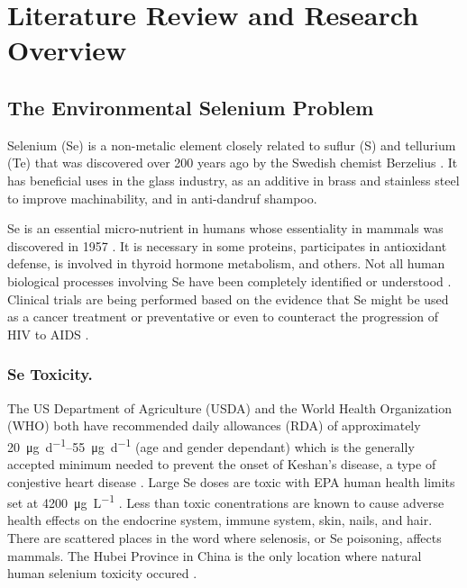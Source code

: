 \chapter{Literature Review and Research Overview}
\label{chap:litreview}

\begin{linenumbers}[1]

\section{The Environmental Selenium Problem}
\label{sec:the selenium problem}

Selenium (Se) is a non-metalic element closely related to suflur (S) and tellurium (Te) that was discovered over 200 years ago by the Swedish chemist Berzelius \parencite{scott1973}.  It has beneficial uses in the glass industry, as an additive in brass and stainless steel to improve machinability, and in anti-dandruf shampoo.  

Se is an essential micro-nutrient in humans whose essentiality in mammals was discovered in 1957 \parencite{schwarz1957}.   It is necessary in some proteins, participates in antioxidant defense, is involved in thyroid hormone metabolism, and others.  Not all human biological processes involving Se have been completely identified or understood \parencite{rayman2000,navarro2000,roman2014}.  Clinical trials are being performed based on the evidence that Se might be used as a cancer treatment or preventative or even to counteract the progression of HIV to AIDS \parencite{rayman2000,roman2014}.

\subsection*{Se Toxicity.}
The US Department of Agriculture (USDA) and the World Health Organization (WHO) both have recommended daily allowances (RDA) of approximately \SIrange{20}{55}{\micro\gram\per\day} (age and gender dependant) which is the generally accepted minimum needed to prevent the onset of Keshan's disease, a type of conjestive heart disease \parencite{world1996,USDA2010}.  Large Se doses are toxic \parencite{roman2014,navarro2000} with EPA human health limits set at \SI{4200}{\micro\gram\per\liter} \parencite{EPA-Se}.  Less than toxic conentrations are known to cause adverse health effects on the endocrine system, immune system, skin, nails, and hair.  There are scattered places in the word where selenosis, or Se poisoning, affects mammals.  The Hubei Province in China is the only location where natural human selenium toxicity occured \parencite{2002Spallholz}.


\end{linenumbers}
